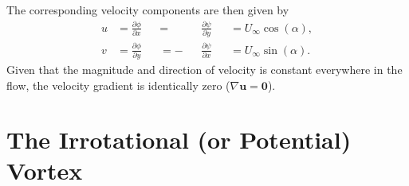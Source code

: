 \documentclass[10pt, twoside]{book}
\begin{document}
			The corresponding velocity components are then given by
			\begin{subequations}
				\label{eq:UniformFlowVel}
				\begin{alignat}{4}
					u &= \frac{\partial\phi}{\partial x} &&=  &&\frac{\partial\psi}{\partial y} &&= U_{\infty}\cos\left(\alpha\right),\label{eq:UniformFlowVelU}\\
					v &= \frac{\partial\phi}{\partial y} &&= -&&\frac{\partial\psi}{\partial x} &&= U_{\infty}\sin\left(\alpha\right).\label{eq:UniformFlowVelV}
				\end{alignat}
			\end{subequations}
			Given that the magnitude and direction of velocity is constant everywhere in the flow, the velocity gradient is identically zero ($\nabla\mathbf{u} = \mathbf{0}$).
			
			
			
		\section{\label{sec:IrrotVortex}The Irrotational (or Potential) Vortex}
			
\end{document}

